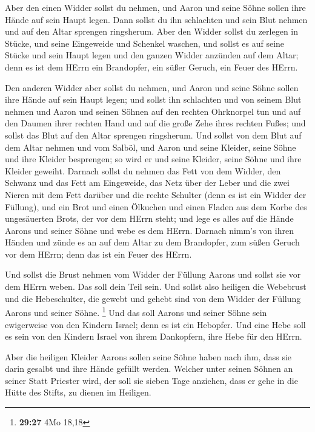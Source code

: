  Aber den einen Widder sollst du nehmen, und Aaron und
seine Söhne sollen ihre Hände auf sein Haupt legen.  Dann
sollst du ihn schlachten und sein Blut nehmen und auf den Altar sprengen
ringsherum.  Aber den Widder sollst du zerlegen in
Stücke, und seine Eingeweide und Schenkel waschen, und sollst es auf
seine Stücke und sein Haupt legen  und den ganzen Widder
anzünden auf dem Altar; denn es ist dem HErrn ein Brandopfer, ein süßer
Geruch, ein Feuer des HErrn.

 Den anderen Widder aber sollst du nehmen, und Aaron und
seine Söhne sollen ihre Hände auf sein Haupt legen;  und
sollst ihn schlachten und von seinem Blut nehmen und Aaron und seinen
Söhnen auf den rechten Ohrknorpel tun und auf den Daumen ihrer rechten
Hand und auf die große Zehe ihres rechten Fußes; und sollst das Blut auf
den Altar sprengen ringsherum.  Und sollst von dem Blut
auf dem Altar nehmen und vom Salböl, und Aaron und seine Kleider, seine
Söhne und ihre Kleider besprengen; so wird er und seine Kleider, seine
Söhne und ihre Kleider geweiht.  Darnach sollst du nehmen
das Fett von dem Widder, den Schwanz und das Fett am Eingeweide, das
Netz über der Leber und die zwei Nieren mit dem Fett darüber und die
rechte Schulter (denn es ist ein Widder der Füllung), 
und ein Brot und einen Ölkuchen und einen Fladen aus dem Korbe des
ungesäuerten Brots, der vor dem HErrn steht;  und lege es
alles auf die Hände Aarons und seiner Söhne und webe es dem HErrn.
 Darnach nimm's von ihren Händen und zünde es an auf dem
Altar zu dem Brandopfer, zum süßen Geruch vor dem HErrn; denn das ist
ein Feuer des HErrn.

 Und sollst die Brust nehmen vom Widder der Füllung
Aarons und sollst sie vor dem HErrn weben. Das soll dein Teil sein.
 Und sollst also heiligen die Webebrust und die
Hebeschulter, die gewebt und gehebt sind von dem Widder der Füllung
Aarons und seiner Söhne. \footnote{\textbf{29:27} 4Mo 18,18}
 Und das soll Aarons und seiner Söhne sein ewigerweise
von den Kindern Israel; denn es ist ein Hebopfer. Und eine Hebe soll es
sein von den Kindern Israel von ihrem Dankopfern, ihre Hebe für den
HErrn.

 Aber die heiligen Kleider Aarons sollen seine Söhne
haben nach ihm, dass sie darin gesalbt und ihre Hände gefüllt werden.
 Welcher unter seinen Söhnen an seiner Statt Priester
wird, der soll sie sieben Tage anziehen, dass er gehe in die Hütte des
Stifts, zu dienen im Heiligen.

